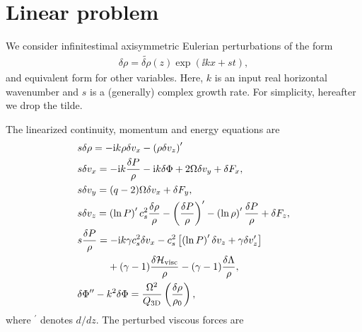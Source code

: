 \section{Linear problem}\label{linear}
We consider infinitestimal axisymmetric Eulerian perturbations of the
form \begin{align}
  \delta \rho= \widetilde{\delta \rho}(z)\exp{\left(\ii kx +
    s t\right)},  
\end{align}
and equivalent form for other variables. Here, $k$  is an input real horizontal
wavenumber and $s$ is a (generally) complex growth rate.  
For simplicity, hereafter we drop the tilde.  


The linearized continuity, momentum and energy equations are
\begin{align}
   &s \delta \rho = - \ii k \rho\delta v_x -
  \left(\rho\delta v_z\right)^\prime \label{lin_mass} \\ 
   &s  \delta v_x = - \ii k\frac{\delta P}{\rho} - \ii k \delta 
  \Phi + 2\Omega \delta v_y + \delta F_x,\\
   &s \delta v_y = (q-2)\Omega\delta v_x + \delta F_y,\\
  &s \delta v_z =
  \left(\ln{P}\right)^\prime c_s^2\frac{\delta\rho}{\rho} -
  \left(\frac{\delta P}{\rho}\right)^\prime -
  \left(\ln{\rho}\right)^\prime\frac{\delta P}{\rho} + \delta F_z, \\ 
  &s \frac{\delta P}{\rho} = 
 - \ii k \gamma c_s^2\delta v_x
- c_s^2\left[
 \left(\ln{P}\right)^\prime\delta v_z + 
  \gamma\delta v_z^\prime\right] \notag\\
   & \phantom{s \frac{\delta P}{\rho}=}
  + (\gamma-1)\frac{\delta\mathcal{H}_\mathrm{visc}}{\rho} 
  -(\gamma-1)\frac{\delta\Lambda}{\rho}
  \label{lin_energy},\\
  &\delta\Phi^{\prime\prime} - k^2\delta\Phi =
  \frac{\Omega^2}{Q_\mathrm{3D}}\left(\frac{\delta\rho}{\rho_0}\right)\label{lin_gravity},  
\end{align}
where $^\prime$ denotes $d/dz$. The perturbed viscous forces are %
